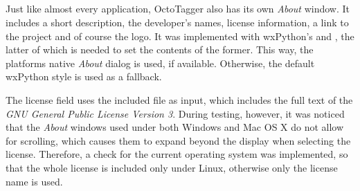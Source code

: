\subsection{}
\def\kapitelautor{Erik Ritschl}

Just like almost every application, OctoTagger also has its own \emph{About} window. It includes  a short description, the developer's names, license information, a link to the project and of course the logo. 
It was implemented with wxPython's  and , the latter of which is needed to set the contents of the former. This way, the platforms native \emph{About} dialog is used, if available. Otherwise, the default wxPython style is used as a fallback. 

The license field uses the included  file as input, which includes the full text of the \emph{GNU General Public License Version 3}. %
During testing, however, it was noticed that the \emph{About} windows used under both Windows and Mac OS X do not allow for scrolling, which causes them to expand beyond the display when selecting the license. Therefore, a check for the current operating system was implemented, so that the whole license is included only under Linux, otherwise only the license name is used.
